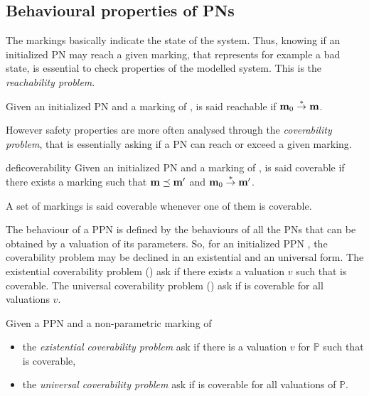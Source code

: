\subsection{Behavioural properties of \acp{PN}}

The markings basically indicate the state of the system. Thus, knowing if an initialized \ac{PN} may reach a given marking, that represents for example a bad state, is essential to check properties of the modelled system. This is the \emph{reachability problem}.

\begin{defi}[Reachability]
  Given an initialized \ac{PN} \NPTm and a marking \marq of \tupleN, \marq is said reachable if $\mathbf{m}_0 \stackrel{*}{\to} \mathbf{m}$.
\end{defi}

However safety properties are more often analysed through the \emph{coverability problem}, that is essentially asking if a \ac{PN} can reach or exceed a given marking.

\begin{restatable}[Coverability]{defi}{coverability}
  Given an initialized \ac{PN} \NPTm and a marking \marq of \tupleN, \marq is said coverable if there exists a marking \marqp such that $\mathbf{m} \preceq \mathbf{m'}$ and $\mathbf{m}_0 \stackrel{*}{\to} \mathbf{m'}$.

  A set of markings is said coverable whenever one of them is coverable.
\end{restatable}

The behaviour of a \ac{PPN} is defined by the behaviours of all the \acp{PN} that can be obtained by a valuation of its parameters.
So, for an initialized \ac{PPN} \tupleS, the coverability problem may be declined in an existential and an universal form.
The existential coverability problem (\Ecov) ask if there exists a valuation $v$ such that \marq is coverable.
The universal coverability problem (\Ucov) ask if \marq is coverable for all valuations $v$.

\begin{defi}
  Given a \ac{PPN} \SPTP and a non-parametric marking \marq of \tupleS
  \begin{itemize}
    \item the \emph{existential coverability problem} ask if there is a valuation $v$ for $\mathbb{P}$ such that \marq is coverable,
    \item the \emph{universal   coverability problem} ask if \marq is coverable for all valuations of $\mathbb{P}$.
  \end{itemize}
\end{defi}


